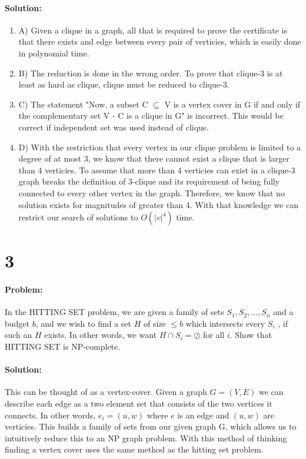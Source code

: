 \documentclass[12pt]{article}
\begin{document}
\paragraph{Solution:}
\begin{enumerate}
\item A) Given a clique in a graph, all that is required to prove the certificate
    is that there exists and edge between every pair of verticies, which is easily
    done in polynomial time.
\item B) The reduction is done in the wrong order.  To prove that clique-3 is at
    least as hard as clique, clique must be reduced to clique-3.
\item C) The statement "Now, a subset C $\subseteq$ V is a vertex cover in G if and only
    if the complementary set V - C is a clique in G" is incorrect.  This would
    be correct if independent set was used instead of clique.
\item D) With the restriction that every vertex in our clique problem is limited
    to a degree of at most 3, we know that there cannot exist a clique that is
    larger than 4 verticies.  To assume that more than 4 verticies can exist in
    a clique-3 graph breaks the definition of 3-clique and its requirement of
    being fully connected to every other vertex in the graph.  Therefore, we
    know that no solution exists for magnitudes of greater than 4.  With that
    knowledge we can restrict our search of solutions to $O(|v|^{4})$ time.
\end{enumerate}


\section*{3}
\paragraph{Problem:}
In the HITTING SET problem, we are given a family of sets ${S_1, S_2 ,
\dots , S_n }$ and a budget $b$, and we wish to find a set $H$ of size
$\le b$ which intersects every $S_i$ , if such an $H$ exists. In other
words, we want $H \cap S_i = \oslash$ for all $i$.  Show that HITTING SET
is NP-complete.

\paragraph{Solution:}
This can be thought of as a vertex-cover.  Given a graph $G=(V,E)$ we can
describe each edge as a two element set that consists of the two vertices it
connects.  In other words, $e_i = (u,w)$ where $e$ is an edge and $(u,w)$ are
verticies.  This builds a family of sets from our given graph G, which allows
us to intuitively reduce this to an NP graph problem.  With this method of
thinking finding a vertex cover uses the same method as the hitting set problem.
\end{document}
